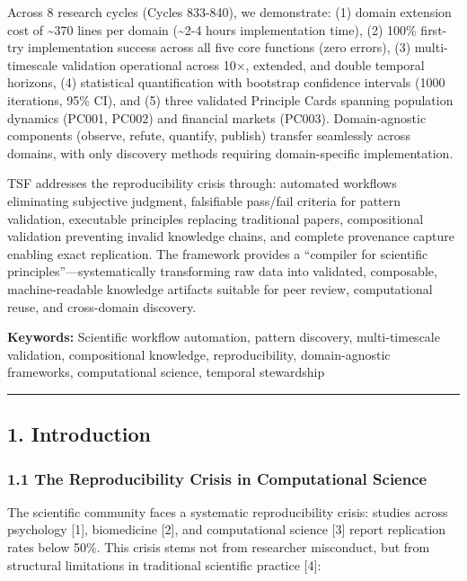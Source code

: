 \documentclass[
]{article}
\begin{document}
Across 8 research cycles (Cycles 833-840), we demonstrate: (1) domain
extension cost of \textasciitilde370 lines per domain
(\textasciitilde2-4 hours implementation time), (2) 100\% first-try
implementation success across all five core functions (zero errors), (3)
multi-timescale validation operational across 10×, extended, and double
temporal horizons, (4) statistical quantification with bootstrap
confidence intervals (1000 iterations, 95\% CI), and (5) three validated
Principle Cards spanning population dynamics (PC001, PC002) and
financial markets (PC003). Domain-agnostic components (observe, refute,
quantify, publish) transfer seamlessly across domains, with only
discovery methods requiring domain-specific implementation.

TSF addresses the reproducibility crisis through: automated workflows
eliminating subjective judgment, falsifiable pass/fail criteria for
pattern validation, executable principles replacing traditional papers,
compositional validation preventing invalid knowledge chains, and
complete provenance capture enabling exact replication. The framework
provides a ``compiler for scientific principles''---systematically
transforming raw data into validated, composable, machine-readable
knowledge artifacts suitable for peer review, computational reuse, and
cross-domain discovery.

\textbf{Keywords:} Scientific workflow automation, pattern discovery,
multi-timescale validation, compositional knowledge, reproducibility,
domain-agnostic frameworks, computational science, temporal stewardship

\begin{center}\rule{0.5\linewidth}{0.5pt}\end{center}

\subsection{1. Introduction}\label{introduction}

\subsubsection{1.1 The Reproducibility Crisis in Computational
Science}\label{the-reproducibility-crisis-in-computational-science}

The scientific community faces a systematic reproducibility crisis:
studies across psychology {[}1{]}, biomedicine {[}2{]}, and
computational science {[}3{]} report replication rates below 50\%. This
crisis stems not from researcher misconduct, but from structural
limitations in traditional scientific practice {[}4{]}:
\end{document}
